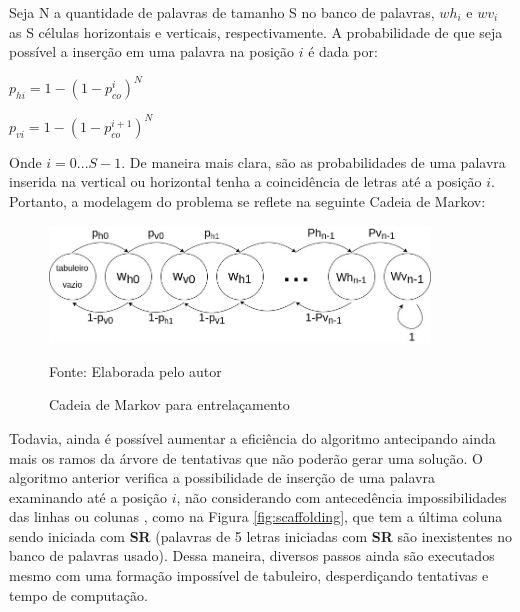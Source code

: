 Seja N a quantidade de palavras de tamanho S no banco de palavras, $wh_{i}$ e $wv_{i}$ as S células horizontais e verticais, respectivamente. A probabilidade de que seja possível a inserção em uma palavra na posição $i$ é dada por:

\begin{center}
    \Large{$p_{hi} = 1 - (1 - p_{co}^{i})^{N}$}
    
    \Large{$p_{vi} = 1 - (1 - p_{co}^{i+1})^{N}$}
\end{center}

Onde $i = 0...S-1$. De maneira mais clara, são as probabilidades de uma palavra inserida na vertical ou horizontal tenha a coincidência de letras até a posição $i$. Portanto, a modelagem do problema se reflete na seguinte Cadeia de Markov:

\begin{figure}[H]
\centering
    \caption{Cadeia de Markov para entrelaçamento}
    \label{fig:markov1}
    \includegraphics[width=0.9\textwidth]{Figuras/markovChain1.jpg}
    
    Fonte: Elaborada pelo autor
\end{figure}



Todavia, ainda é possível aumentar a eficiência do algoritmo antecipando ainda mais os ramos da árvore de tentativas que não poderão gerar uma solução. O algoritmo anterior verifica a possibilidade de inserção de uma palavra examinando até a posição $i$, não considerando com antecedência impossibilidades das linhas ou colunas , como na Figura \ref{fig:scaffolding}, que tem a última coluna sendo iniciada com \textbf{SR} (palavras de 5 letras iniciadas com \textbf{SR} são inexistentes no banco de palavras usado). Dessa maneira, diversos passos ainda são executados mesmo com uma formação impossível de tabuleiro, desperdiçando tentativas e tempo de computação.


